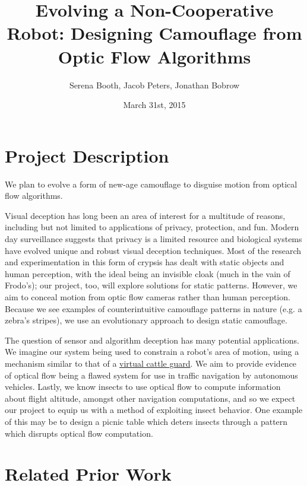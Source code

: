\documentclass[11pt,letter]{article}
\begin{document}
\title{Evolving a Non-Cooperative Robot: Designing Camouflage from Optic Flow Algorithms}

\author{Serena Booth, Jacob Peters, Jonathan Bobrow}

\date{March 31st, 2015}
 
\maketitle 
 
\section{Project Description}
We plan to evolve a form of new-age camouflage to disguise motion from optical flow algorithms. 

Visual deception has long been an area of interest for a multitude of reasons, including but not limited to applications of privacy, protection, and fun. Modern day surveillance suggests that privacy is a limited resource and biological systems have evolved unique and robust visual deception techniques. Most of the research and experimentation in this form of crypsis has dealt with static objects and human perception, with the ideal being an invisible cloak (much in the vain of Frodo's); our project, too, will explore solutions for static patterns. However, we aim to conceal motion from optic flow cameras rather than human perception. Because we see examples of counterintuitive camouflage patterns in nature (e.g. a zebra's stripes), we use an evolutionary approach to design static camouflage. 

The question of sensor and algorithm deception has many potential applications. We imagine our system being used to constrain a robot’s area of motion, using a mechanism similar to that of a \href{http://upload.wikimedia.org/wikipedia/commons/6/6b/Lone_Pine,_CA_Virtual_Cattle_Guard.jpg}{virtual cattle guard}. We aim to provide evidence of optical flow being a flawed system for use in traffic navigation by autonomous vehicles. Lastly, we know insects to use optical flow to compute information about flight altitude, amongst other navigation computations, and so we expect our project to equip us with a method of exploiting insect behavior. One example of this may be to design a picnic table which deters insects through a pattern which disrupts optical flow computation.

\section{Related Prior Work} 
\end{document}

